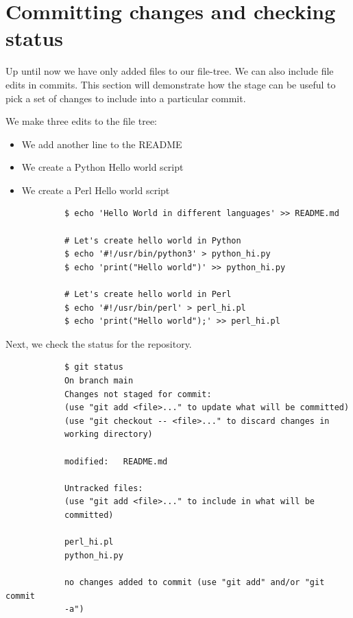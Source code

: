 \documentclass[../main/git_course_main.tex]{subfiles}
\begin{document}
	\newpage
	\section{Committing changes and checking status}
	
	Up until now we have only added files to our file-tree. We can also include file edits in commits. This section will demonstrate how the stage can be useful to pick a set of changes to include into a particular commit.
	
	We make three edits to the file tree:
	
	\begin{itemize}
		\item We add another line to the README
		\item We create a Python Hello world script
		\item We create a Perl Hello world script
	\end{itemize}
	
	\begin{codebox}
		\begin{lstlisting}
			$ echo 'Hello World in different languages' >> README.md
			
			# Let's create hello world in Python
			$ echo '#!/usr/bin/python3' > python_hi.py
			$ echo 'print("Hello world")' >> python_hi.py
			
			# Let's create hello world in Perl
			$ echo '#!/usr/bin/perl' > perl_hi.pl
			$ echo 'print("Hello world");' >> perl_hi.pl
		\end{lstlisting}
	\end{codebox}
	
	Next, we check the status for the repository.
	
	\begin{codebox}
		\begin{lstlisting}
			$ git status
			On branch main
			Changes not staged for commit:
			(use "git add <file>..." to update what will be committed)
			(use "git checkout -- <file>..." to discard changes in 
			working directory)
			
			modified:   README.md
			
			Untracked files:
			(use "git add <file>..." to include in what will be 
			committed)
			
			perl_hi.pl
			python_hi.py
			
			no changes added to commit (use "git add" and/or "git commit 
			-a")
		\end{lstlisting}
	\end{codebox}
	
\end{document}

